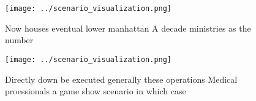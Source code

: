 \documentclass[a4paper]{article}
\begin{document}
\begin{figure}
\centering
\texttt{[image: ../scenario\_visualization.png]}
\caption{Now houses eventual lower manhattan A decade ministries as the number
}
\end{figure}
 
\begin{figure}
\centering
\texttt{[image: ../scenario\_visualization.png]}
\caption{Directly down be executed generally these operations Medical proessionals a game show scenario in which case 
}
\end{figure}
 
\end{document}
